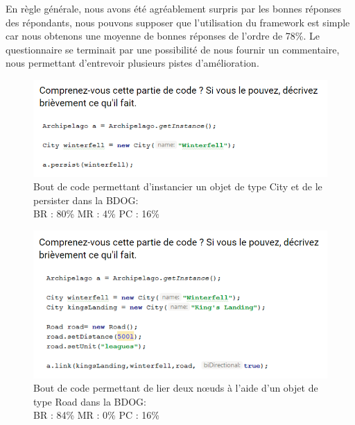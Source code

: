 \documentclass[a4paper,fleqn,12pt,oneside]{report}
\begin{document}
En règle générale, nous avons été agréablement surpris par les bonnes réponses des répondants, nous pouvons supposer que l'utilisation du framework est simple car nous obtenons une moyenne de bonnes réponses de l'ordre de 78\%. Le questionnaire se terminait par une possibilité de nous fournir un commentaire, nous permettant d'entrevoir plusieurs pistes d'amélioration.

\newpage
{}
\begin{figure}[!ht]
\centering
\includegraphics[scale=1]{figures/Snippet1.png}
\caption{Bout de code permettant d'instancier un objet de type City et de le persister dans la BDOG:\\BR : 80\% MR : 4\% PC : 16\% }
\label{fig:Snippet1}
\end{figure}

\begin{figure}[!ht]
\centering
\includegraphics[scale=1]{figures/Snippet2.png}
\caption{Bout de code permettant de lier deux nœuds à l'aide d'un objet de type Road dans la BDOG:\\BR : 84\% MR : 0\% PC : 16\% }
\label{fig:Snippet2}
\end{figure}

\newpage
\end{document}
